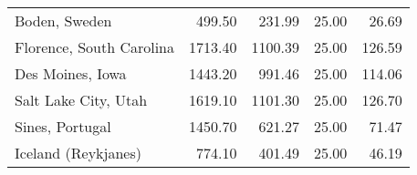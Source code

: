 \begin{table}
\begin{tabular}{lrrrr}
           Boden, Sweden &                 499.50 &               231.99 &            25.00 &                         26.69 \\
Florence, South Carolina &                1713.40 &              1100.39 &            25.00 &                        126.59 \\
        Des Moines, Iowa &                1443.20 &               991.46 &            25.00 &                        114.06 \\
    Salt Lake City, Utah &                1619.10 &              1101.30 &            25.00 &                        126.70 \\
         Sines, Portugal &                1450.70 &               621.27 &            25.00 &                         71.47 \\
     Iceland (Reykjanes) &                 774.10 &               401.49 &            25.00 &                         46.19 \\
\bottomrule
\end{tabular}
\end{table}
